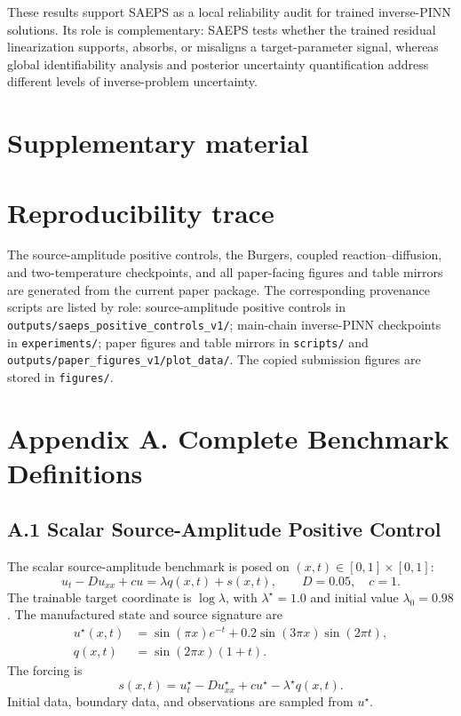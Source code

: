 \documentclass[preprint,12pt]{elsarticle}
\begin{document}
These results support SAEPS as a local reliability audit for trained inverse-PINN solutions. Its role is complementary: SAEPS tests whether the trained residual linearization supports, absorbs, or misaligns a target-parameter signal, whereas global identifiability analysis and posterior uncertainty quantification address different levels of inverse-problem uncertainty.

\FloatBarrier
\clearpage
\section*{Supplementary material}
\setcounter{table}{0}
\setcounter{figure}{0}
\renewcommand{\thetable}{S\arabic{table}}
\renewcommand{\thefigure}{S\arabic{figure}}

\section*{Reproducibility trace}

The source-amplitude positive controls, the Burgers, coupled reaction--diffusion, and two-temperature checkpoints, and all paper-facing figures and table mirrors are generated from the current paper package.  The corresponding provenance scripts are listed by role: source-amplitude positive controls in \texttt{outputs/saeps\_positive\_controls\_v1/}; main-chain inverse-PINN checkpoints in \texttt{experiments/}; paper figures and table mirrors in \texttt{scripts/} and \texttt{outputs/paper\_figures\_v1/plot\_data/}.  The copied submission figures are stored in \texttt{figures/}.

\section*{Appendix A. Complete Benchmark Definitions}

\subsection*{A.1 Scalar Source-Amplitude Positive Control}

The scalar source-amplitude benchmark is posed on $(x,t)\in[0,1]\times[0,1]$:
\begin{equation}
    u_t-Du_{xx}+cu=\lambda q(x,t)+s(x,t),
    \qquad D=0.05,\quad c=1.
\end{equation}
The trainable target coordinate is $\log \lambda$, with $\lambda^\star=1.0$ and initial value $\lambda_0=0.98$.  The manufactured state and source signature are
\begin{align}
    u^\star(x,t)&=\sin(\pi x)e^{-t}+0.2\sin(3\pi x)\sin(2\pi t),\\
    q(x,t)&=\sin(2\pi x)(1+t).
\end{align}
The forcing is
\begin{equation}
    s(x,t)=u_t^\star-Du_{xx}^\star+cu^\star-\lambda^\star q(x,t).
\end{equation}
Initial data, boundary data, and observations are sampled from $u^\star$.
\end{document}

